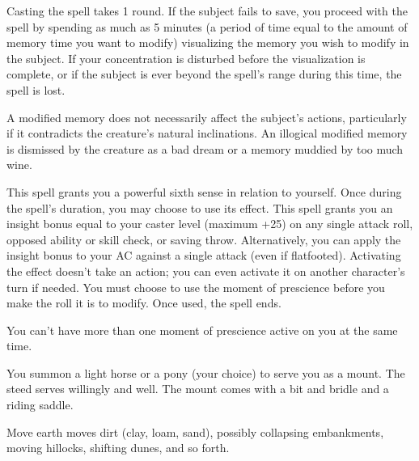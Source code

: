 \begin{multicols}{2}
\begin{small}
\smallskip\noindent Casting the spell takes 1 round. If the subject fails to save, you proceed with the spell by spending as much as 5 minutes (a period of time equal to the amount of memory time you want to modify) visualizing the memory you wish to modify in the subject. If your concentration is disturbed before the visualization is complete, or if the subject is ever beyond the spell's range during this time, the spell is lost.

\smallskip\noindent A modified memory does not necessarily affect the subject's actions, particularly if it contradicts the creature's natural inclinations. An illogical modified memory is dismissed by the creature as a bad dream or a memory muddied by too much wine. 

\noindent This spell grants you a powerful sixth sense in relation to yourself. Once during the spell's duration, you may choose to use its effect. This spell grants you an insight bonus equal to your caster level (maximum +25) on any single attack roll, opposed ability or skill check, or saving throw. Alternatively, you can apply the insight bonus to your AC against a single attack (even if flatfooted). Activating the effect doesn't take an action; you can even activate it on another character's turn if needed. You must choose to use the moment of prescience before you make the roll it is to modify. Once used, the spell ends.

\smallskip\noindent You can't have more than one moment of prescience active on you at the same time.

\noindent You summon a light horse or a pony (your choice) to serve you as a mount. The steed serves willingly and well. The mount comes with a bit and bridle and a riding saddle.


\noindent Move earth moves dirt (clay, loam, sand), possibly collapsing embankments, moving hillocks, shifting dunes, and so forth.


\end{small}
\end{multicols}
